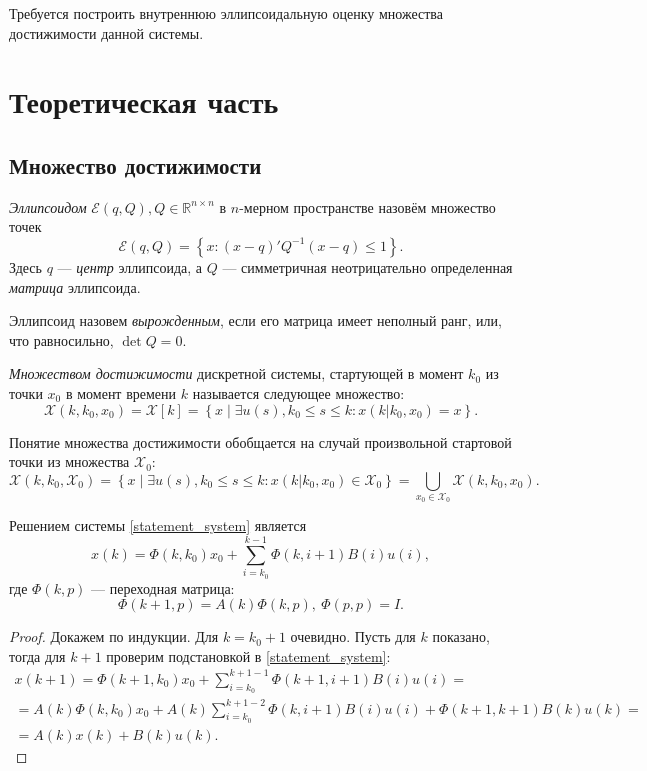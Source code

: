 \documentclass[10pt, a4paper]{article}
\renewcommand{\ell}{\mathcal{E}}
\begin{document}
Требуется построить внутреннюю эллипсоидальную оценку множества достижимости данной системы.

\section{Теоретическая часть}
\subsection{Множество достижимости}
\begin{df}
\textit{Эллипсоидом} $\ell(q,Q), Q\in\mathbb{R}^{n\times n}$ в $n$-мерном пространстве назовём множество точек
\[ \ell(q,Q) = \left\{ x\colon (x-q)'Q^{-1}(x-q) \leqslant 1 \right\}. \]
Здесь $q$ --- \textit{центр} эллипсоида, а $Q$ --- симметричная неотрицательно определенная \textit{матрица} эллипсоида. 
\end{df}
Эллипсоид назовем \textit{вырожденным}, если его матрица имеет неполный ранг, или, что равносильно, $\det Q = 0$.
\begin{df}
\textit{Множеством достижимости} дискретной системы, стартующей в момент $k_0$ из точки $x_0$ в момент времени $k$ называется следующее множество:
\[ \mathcal{X}(k,k_0,x_0) = \mathcal{X}[k] = \left\{ x \middle| \exists u(s), k_0\leqslant s\leqslant k\colon x(k|k_0,x_0)=x \right\}.\]
\end{df}
Понятие множества достижимости обобщается на случай произвольной стартовой точки из множества $\mathcal{X}_0$:
\[ \mathcal{X}(k,k_0,\mathcal{X}_0) = \left\{ x \middle| \exists u(s), k_0\leqslant s\leqslant k\colon x(k|k_0,x_0)\in \mathcal{X}_0 \right\} = \bigcup\limits_{x_0\in\mathcal{X}_0}\mathcal{X}(k,k_0,x_0).\]
\begin{theorem}
Решением системы \eqref{statement_system} является 
\begin{equation}\label{solution}
	x(k) = \Phi(k,k_0)x_0 + \sum\limits_{i=k_0}^{k-1}\Phi(k,i+1)B(i)u(i),
\end{equation} 
где $\Phi(k,p)$ --- переходная матрица:
\begin{equation}\label{solution}
	\Phi(k+1,p) = A(k)\Phi(k,p),\ \Phi(p,p)=I.
\end{equation}
\end{theorem}
\begin{proof}
	Докажем по индукции. Для $k=k_0+1$ очевидно. Пусть для $k$ показано, тогда для $k+1$
	проверим подстановкой в \eqref{statement_system}:
	\begin{gather*}
		{x}(k+1) = \Phi(k+1,k_0)x_0 + \sum\limits_{i=k_0}^{k+1-1}\Phi(k+1,i+1)B(i)u(i) = 
		\\ = A(k)\Phi(k,k_0)x_0 + A(k)\sum\limits_{i=k_0}^{k+1-2}\Phi(k,i+1)B(i)u(i) + 
		\Phi(k+1,k+1)B(k)u(k) = \\ = A(k)x(k) + B(k)u(k).
	\end{gather*}
\end{proof}
\end{document}
